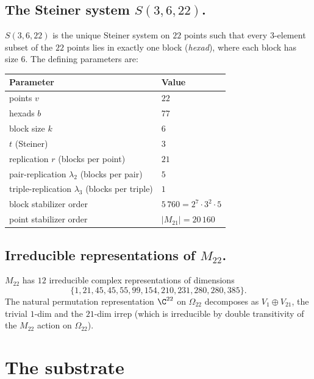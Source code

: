 \documentclass[11pt,reqno]{amsart}
\theoremstyle{plain}
\theoremstyle{definition}
\theoremstyle{remark}
\newcommand{\Mtwentytwo}{M_{22}}
\begin{document}
\subsection{The Steiner system $S(3, 6, 22)$.}
$S(3, 6, 22)$ is the unique Steiner system on $22$ points such that
every $3$-element subset of the $22$ points lies in exactly one block
(\emph{hexad}), where each block has size $6$. The defining parameters
are:
\begin{center}
\begin{tabular}{ll}
\toprule
Parameter & Value \\
\midrule
points $v$ & $22$ \\
hexads $b$ & $77$ \\
block size $k$ & $6$ \\
$t$ (Steiner) & $3$ \\
replication $r$ (blocks per point) & $21$ \\
pair-replication $\lambda_{2}$ (blocks per pair) & $5$ \\
triple-replication $\lambda_{3}$ (blocks per triple) & $1$ \\
block stabilizer order & $5\,760 = 2^{7} \cdot 3^{2} \cdot 5$ \\
point stabilizer order & $|M_{21}| = 20\,160$ \\
\bottomrule
\end{tabular}
\end{center}

\subsection{Irreducible representations of $\Mtwentytwo$.}
$\Mtwentytwo$ has $12$ irreducible complex representations of
dimensions
\[
  \{1, 21, 45, 45, 55, 99, 154, 210, 231, 280, 280, 385\}.
\]
The natural permutation representation $\C^{22}$ on $\Omega_{22}$
decomposes as $V_{1} \oplus V_{21}$, the trivial $1$-dim and the
$21$-dim irrep (which is irreducible by double transitivity of the
$\Mtwentytwo$ action on $\Omega_{22}$).

\section{The substrate}
\label{sec:substrate}
\end{document}
